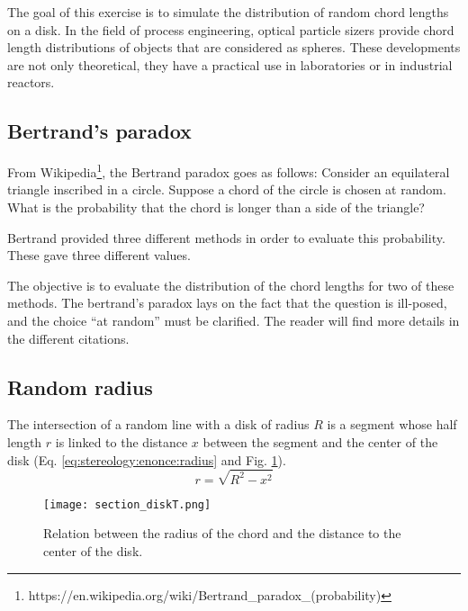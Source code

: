 The goal of this exercise is to simulate the distribution of random chord lengths on a disk. In the field of process engineering, optical particle sizers provide chord length distributions of objects that are considered as spheres. These developments are not only theoretical, they have a practical use in laboratories or in industrial reactors.

\subsection{Bertrand's paradox}
From Wikipedia\footnote{https://en.wikipedia.org/wiki/Bertrand\_paradox\_(probability)}, the Bertrand paradox goes as follows: Consider an equilateral triangle inscribed in a circle. Suppose a chord of the circle is chosen at random. What is the probability that the chord is longer than a side of the triangle?

Bertrand provided three different methods in order to evaluate this probability. These gave three different values. 

\begin{rmq}The objective is to evaluate the distribution of the chord lengths for two of these methods. The bertrand's paradox lays on the fact that the question is ill-posed, and the choice ``at random'' must be clarified. The reader will find more details in the different citations.
\end{rmq}


\subsection{Random radius}
The intersection of a random line with a disk of radius $R$ is a segment whose half length $r$ is linked to the distance $x$ between the segment and the center of the disk (Eq. \ref{eq:stereology:enonce:radius} and Fig. \ref{fig:stereology:enonce:disk}). 
\begin{equation}
r=\sqrt{R^2-x^2} \label{eq:stereology:enonce:radius}
\end{equation}

\begin{figure}[H]
\centering\caption{Relation between the radius of the chord and the distance to the center of the disk.}%
%
\texttt{[image: section\_diskT.png]}%
\label{fig:stereology:enonce:disk}%
\end{figure}

\vspace*{-10pt}

